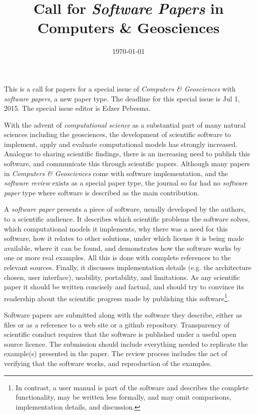 \documentclass{article}
\date{\today}
\title{\bf Call for {\em Software Papers} in \\ Computers \& Geosciences}
\begin{document}
\maketitle

This is a call for papers for a special issue of {\em Computers
\& Geosciences} with {\em software papers}, a new paper type. The
deadline for this special issue is Jul 1, 2015. The special issue
editor is Edzer Pebesma.

With the advent of {\em computational science} as a substantial
part of many natural sciences including the geosciences, the
development of scientific software to implement, apply and evaluate
computational models has strongly increased. Analogue to sharing
scientific findings, there is an increasing need to publish this
software, and communicate this through scientific papers. Although
many papers in {\em Computers \& Geosciences} come with software
implementation, and the {\em software review} exists as a special
paper type, the journal so far had no {\em software paper} type
where software is described as the main contribution.

A {\em software paper} presents a piece of software, usually
developed by the authors, to a scientific audience.  It describes
which scientific problems the software solves, which computational
models it implements, why there was a need for this software,
how it relates to other solutions, under which license it is
being made available, where it can be found, and demonstrates
how the software works by one or more real examples. All this is
done with complete references to the relevant sources. Finally,
it discusses implementation details (e.g. the architecture chosen,
user interface), usability, portability, and limitations.  As any
scientific paper it should be written concisely and factual, and
should try to convince its readership about the scientific progress
made by publishing this software\footnote{In contrast, a user manual
is part of the software and describes the complete functionality, may
be written less formally, and may omit comparisons, implementation
details, and discussion.}.

Software papers are submitted along with the software they
describe, either as files or as a reference to a web site or a
github repository.  Transparency of scientific conduct requires that
the software is published under a useful open source licence. The
submission should include everything needed to replicate the
example(s) presented in the paper. The review process includes
the act of verifying that the software works, and reproduction of
the examples.
\end{document}
